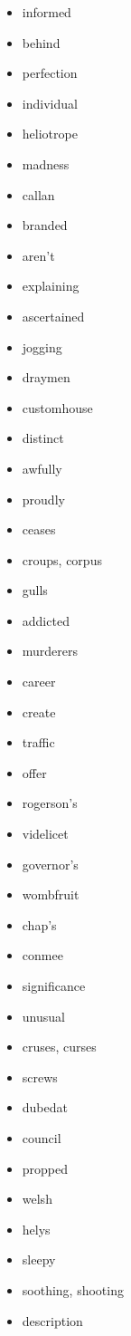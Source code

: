 \documentclass{article}
\begin{document}
\begin{itemize}
    \item informed
    \item behind
    \item perfection
    \item individual
    \item heliotrope
    \item madness
    \item callan
    \item branded
    \item aren't
    \item explaining
    \item ascertained
    \item jogging
    \item draymen
    \item customhouse
    \item distinct
    \item awfully
    \item proudly
    \item ceases
    \item croups, corpus
    \item gulls
    \item addicted
    \item murderers
    \item career
    \item create
    \item traffic
    \item offer
    \item rogerson's
    \item videlicet
    \item governor's
    \item wombfruit
    \item chap's
    \item conmee
    \item significance
    \item unusual
    \item cruses, curses
    \item screws
    \item dubedat
    \item council
    \item propped
    \item welsh
    \item helys
    \item sleepy
    \item soothing, shooting
    \item description

\end{itemize}
\end{document}
